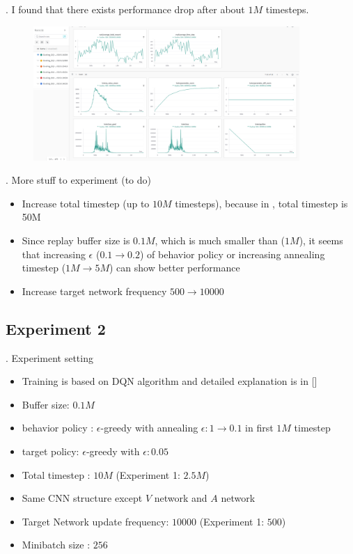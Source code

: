 \documentclass[8pt]{beamer}
\begin{document}
\begin{frame}{.}
    I found that there exists performance drop after about $1M$ timesteps.
    \begin{figure}
        \includegraphics[width=0.9\textwidth]{DuelingDQNExp1_1.png}
    \end{figure}
\end{frame}

\begin{frame}{.}
    More stuff to experiment (to do)
    \begin{itemize}
        \item Increase total timestep (up to $10M$ timesteps), because in \cite{mnih2015human}, total timestep is 50M
        \item Since replay buffer size is $0.1M$, which is much smaller than \cite{mnih2015human} ($1M$), it seems that increasing $\epsilon$ ($0.1 \rightarrow 0.2$) of behavior policy or increasing annealing timestep ($1M \rightarrow 5M$) can show better performance
        \item Increase target network frequency $500 \rightarrow 10000$
    \end{itemize}
\end{frame}

\subsection{Experiment 2}
\begin{frame}{.}
    Experiment setting
    \begin{itemize}
        \item Training is based on DQN algorithm and detailed explanation is in [\cite{mnih2015human}]
        \item Buffer size: $0.1M$
        \item behavior policy : $\epsilon$-greedy with annealing $\epsilon : 1 \rightarrow 0.1$ in first $1M$ timestep
        \item target policy: $\epsilon$-greedy with $\epsilon: 0.05$
        \item Total timestep : $10M$ (Experiment 1: $2.5M$)
        \item Same CNN structure except $V$ network and $A$ network
        \item Target Network update frequency: $10000$ (Experiment 1: $500$)
        \item Minibatch size : $256$
    \end{itemize}
\end{frame}
\end{document}
